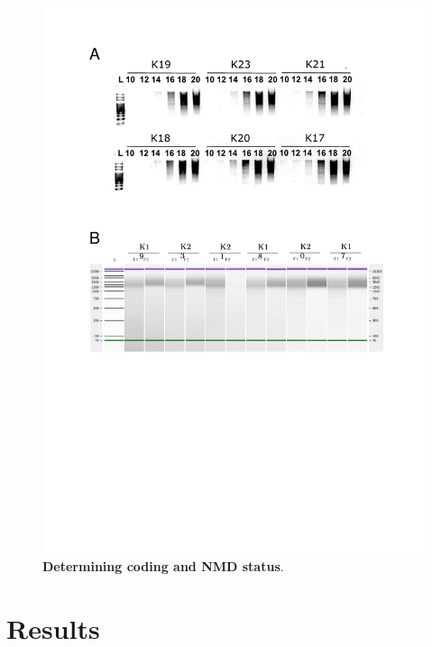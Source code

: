 \begin{figure}[htp]
	\centering
	\includegraphics[page=8,trim={0cm 1cm 0cm 0cm},clip,scale = 0.8]{Figures/TargetedTranscriptome_LabResults}
	\captionsetup{width=0.95\textwidth,singlelinecheck=off}
	\caption[Determining coding and NMD status]%
	{\textbf{Determining coding and NMD status}.  
	}
	\label{fig:Targeted_isoforms_cpat}
\end{figure}

\newpage
\section{Results}
